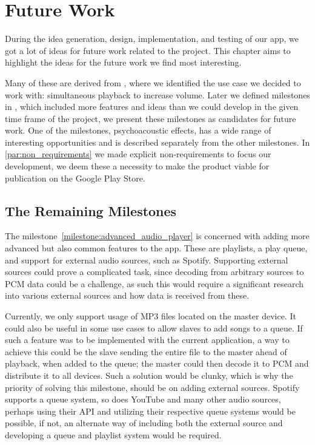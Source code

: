 \chapter{Future Work}\label{cha:future_work}
During the idea generation, design, implementation, and testing of our app, we got a lot of ideas for future work related to the project.
This chapter aims to highlight the ideas for the future work we find most interesting.

Many of these are derived from , where we identified the use case we decided to work with: simultaneous playback to increase volume.
Later we defined milestones in , which included more features and ideas than we could develop in the given time frame of the project, we present these milestones as candidates for future work.
One of the milestones, psychoacoustic effects, has a wide range of interesting opportunities and is described separately from the other milestones.
In \cref{par:non_requirements} we made explicit non-requirements to focus our development, we deem these a necessity to make the product viable for publication on the Google Play Store.

\section{The Remaining Milestones}
The milestone~\ref{milestone:advanced_audio_player} is concerned with adding more advanced but also common features to the app.
These are playlists, a play queue, and support for external audio sources, such as Spotify.
Supporting external sources could prove a complicated task, since decoding from arbitrary sources to \ac{PCM} data could be a challenge, as such this would require a significant research into various external sources and how data is received from these.

Currently, we only support usage of MP3 files located on the master device.
It could also be useful in some use cases to allow slaves to add songs to a queue.
If such a feature was to be implemented with the current application, a way to achieve this could be the slave sending the entire file to the master ahead of playback, when added to the queue; the master could then decode it to \ac{PCM} and distribute it to all devices.
Such a solution would be clunky, which is why the priority of solving this milestone, should be on adding external sources.
Spotify supports a queue system, so does YouTube and many other audio sources, perhaps using their API and utilizing their respective queue systems would be possible, if not, an alternate way of including both the external source and developing a queue and playlist system would be required.

